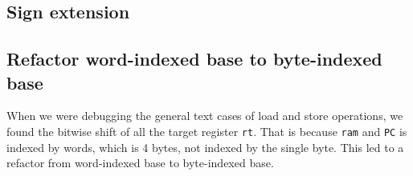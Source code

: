 \documentclass[11pt]{article}
\begin{document}
\subsection{Sign extension}

\subsection{Refactor word-indexed base to byte-indexed base}
When we were debugging the general text cases of load and store operations, 
we found the bitwise shift of all the target register \texttt{rt}.
That is because \texttt{ram} and \texttt{PC} is indexed by words, 
which is 4 bytes, not indexed by the single byte. This led to a  
refactor from word-indexed base to byte-indexed base. 
\end{document}
